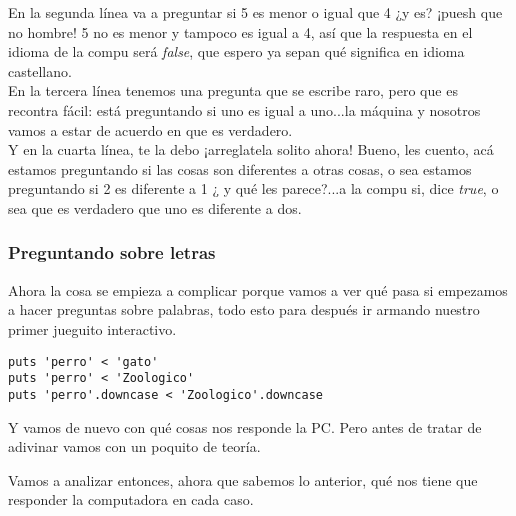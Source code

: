 En la segunda línea va a preguntar si 5 es menor o igual que 4 ¿y es? ¡puesh que no hombre! 5 no es menor y tampoco es igual a 4, así que la respuesta en el idioma de la compu será \emph{false}, que espero  ya sepan qué significa en idioma castellano.\\

En la tercera línea tenemos una pregunta que se escribe raro, pero que es recontra fácil: está preguntando si uno es igual a uno...la máquina y nosotros vamos a estar de acuerdo en que es verdadero.\\

Y en la cuarta línea, te la debo ¡arreglatela solito ahora! Bueno, les cuento, acá estamos preguntando si las cosas son diferentes a otras cosas, o sea estamos preguntando si 2 es diferente a 1 ¿ y qué les parece?...a la compu si, dice \emph{true}, o sea que es verdadero que uno es diferente a dos.

\subsubsection{Preguntando sobre letras}
Ahora la cosa se empieza a complicar porque vamos a ver qué pasa si empezamos a hacer preguntas sobre palabras, todo esto para después ir armando nuestro primer jueguito interactivo.

\begin{lstlisting}
puts 'perro' < 'gato'
puts 'perro' < 'Zoologico'
puts 'perro'.downcase < 'Zoologico'.downcase
\end{lstlisting}

Y vamos de nuevo con qué cosas nos responde la PC. Pero antes de tratar de adivinar vamos con un poquito de teoría.


Vamos a analizar entonces, ahora que sabemos lo anterior, qué nos tiene que responder la computadora en cada caso.\\


